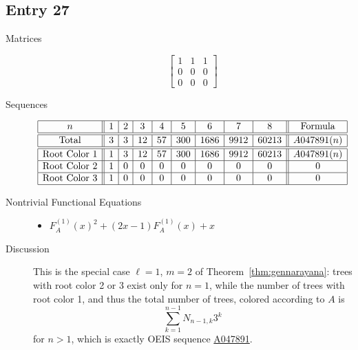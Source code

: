 \documentclass[12pt]{amsart}
\newcommand{\seqnum}[1]{\href{https://oeis.org/#1}{#1}}
\newcommand{\gff}[2]{F_{#2}^{(#1)}(x)}
\newcommand{\gfa}[1]{\gff{#1}{A}}
\begin{document}
\subsection*{Entry 27}
\begin{description}
    \item[Matrices]
    
    \[\begin{bmatrix}
1 & 1 & 1 \\
0 & 0 & 0 \\
0 & 0 & 0
\end{bmatrix}\]
    \item[Sequences]\hspace*{\fill}\vspace{-0.5cm}
    \begin{center}
        \[
        \begin{array}{|c||c|c|c|c|c|c|c|c||c|}\hline
           n  & 1 & 2 & 3 & 4 & 5 & 6 & 7 & 8  & \text{Formula}\\\hline\hline
           \text{Total}  & 3 & 3 & 12 & 57 & 300 & 1686 & 9912 & 60213 & A047891(n)\\\hline\hline
           \text{Root Color }1 & 1 & 3 & 12 & 57 & 300 & 1686 & 9912 & 60213 & A047891(n)\\\hline
           \text{Root Color }2 & 1 & 0 & 0 & 0 & 0 & 0 & 0 & 0 & 0\\\hline
           \text{Root Color }3 & 1 & 0 & 0 & 0 & 0 & 0 & 0 & 0 & 0\\\hline
        \end{array}
        \]
    \end{center}
    
    \item[Nontrivial Functional Equations]\hspace*{\fill}

    \begin{itemize}
\item $\gfa{1}^2+(2x - 1)\gfa{1}+x$

\end{itemize}
    \item[Discussion]
This is the special case $\ell=1$, $m=2$ of Theorem~\ref{thm:gennarayana}: trees with root color 2 or 3 exist only for $n=1$, while the number of trees with root color 1, and thus the total number of trees, colored according to $A$ is
$$\sum_{k=1}^{n-1} N_{n-1,k} 3^k$$
for $n > 1$, which is exactly OEIS sequence \seqnum{A047891}.
\end{description}
\end{document}
